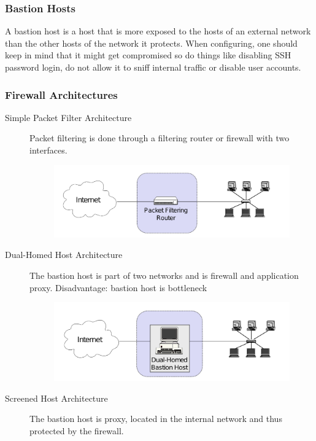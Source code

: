 \subsubsection*{Bastion Hosts}
A bastion host is a host that is more exposed to the hosts of an external network than the other hosts of the network it protects.
When configuring, one should keep in mind that it might get compromised so do things like disabling SSH password login, do not allow it to sniff internal traffic or disable user accounts.

\subsubsection*{Firewall Architectures}
\begin{description}
  \item[Simple Packet Filter Architecture] Packet filtering is done through a filtering router or firewall with two interfaces.
    \begin{figure}[H]
      \centering
      \includegraphics[width=.8\textwidth]{figures/firewall_simple_packet_filter_architecture.png}
    \end{figure}
  \item[Dual-Homed Host Architecture] The bastion host is part of two networks and is firewall and application proxy.
    Disadvantage: bastion host is bottleneck
    \begin{figure}[H]
      \centering
    \includegraphics[width=.8\textwidth]{figures/firewall_dual-homed_host_architecture}
    \end{figure}
  \item[Screened Host Architecture] The bastion host is proxy, located in the internal network and thus protected by the firewall.
    \begin{figure}[H]

\end{figure}
\end{description}
